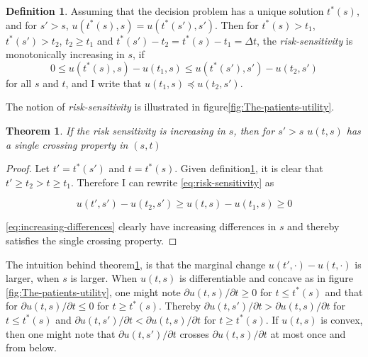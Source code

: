 \documentclass[10pt,a4paper]{article} %
\newtheorem{thm}{Theorem}[section]
\theoremstyle{definition}
\newtheorem{defn}{Definition}[section]
\theoremstyle{remark}
\begin{document}
\begin{defn}\label{def:risk-sensitivity}
Assuming that the decision problem has
a unique solution $t^{*}(s)$, and for $s'>s$, $u(t^{*}(s),s)=u(t^{*}(s'),s')$.
Then for $t^{*}(s)>t_{1}$, $t^{*}(s')>t_{2}$, $t_{2}\ge t_{1}$
and $t^{*}(s')-t_{2}=t^{*}(s)-t_{1}=\Delta t$, the \emph{risk-sensitivity}
is monotonically increasing in $s$, if
\begin{equation}
0\le u(t^{*}(s),s)-u(t_{1},s)\le u(t^{*}(s'),s')-u(t_{2},s')\label{eq:risk-sensitivity}
\end{equation}
for all $s$ and $t$, and I write that $u(t_{1},s)\preceq u(t_{2},s')$.
\end{defn}

The notion of \emph{risk-sensitivity} is illustrated in figure\ref{fig:The-patients-utility}.

\begin{thm}\label{thm:single-crossing}
If the risk sensitivity is increasing
in $s$, then for $s'>s$ $u(t,s)$ has a single crossing property
in $(s,t)$
\end{thm}

\begin{proof}
Let $t'=t^{*}(s')$ and $t=t^{*}(s)$. Given definition\ref{def:risk-sensitivity},
it is clear that $t'\ge t_{2}>t\ge t_{1}$. Therefore I can rewrite
\eqref{eq:risk-sensitivity} as

\begin{equation}
u(t',s')-u(t_{2},s')\ge u(t,s)-u(t_{1},s)\ge0\label{eq:increasing-differences}
\end{equation}

\eqref{eq:increasing-differences} clearly have increasing differences
in $s$ and thereby satisfies the single crossing property.
\end{proof}

The intuition behind theorem\ref{thm:single-crossing}, is that the
marginal change $u(t',\cdot)-u(t,\cdot)$ is larger, when $s$ is
larger. When $u(t,s)$ is differentiable and concave as in figure
\ref{fig:The-patients-utility}, one might note $\partial u(t,s)/\partial t\ge0$
for $t\le t^{*}(s)$ and that for $\partial u(t,s)/\partial t\le0$
for $t\ge t^{*}(s)$. Thereby $\partial u(t,s')/\partial t>\partial u(t,s)/\partial t$
for $t\le t^{*}(s)$ and $\partial u(t,s')/\partial t<\partial u(t,s)/\partial t$
for $t\ge t^{*}(s)$. If $u(t,s)$ is convex, then one might note
that $\partial u(t,s')/\partial t$ crosses $\partial u(t,s)/\partial t$
at most once and from below.
\end{document}
